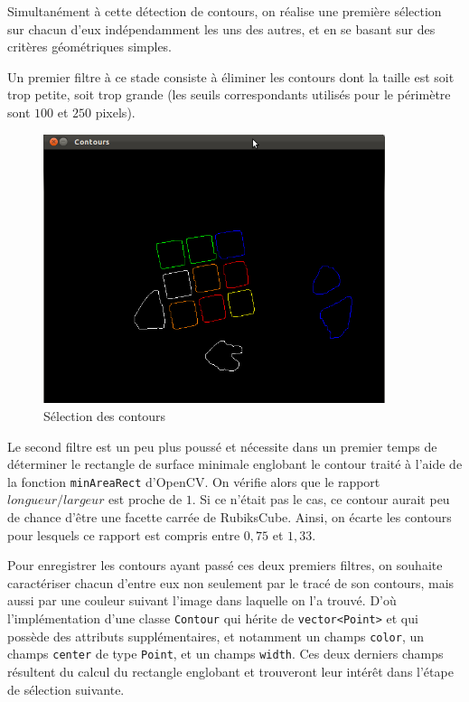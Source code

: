 \documentclass[a4paper,11pt]{article}
\begin{document}
Simultanément à cette détection de contours, on réalise une première sélection sur chacun d'eux indépendamment
les uns des autres, et en se basant sur des critères géométriques simples.

Un premier filtre à ce stade consiste à éliminer les contours dont la taille est soit trop petite, soit trop
grande (les seuils correspondants utilisés pour le périmètre sont $100$ et $250$ pixels).

\begin{figure}[ht]
\begin{center}
 \includegraphics[width=10cm]{contours.png} 
\end{center}
 \caption{Sélection des contours}
 \label{Sélection des contours}
\end{figure}

Le second filtre est un peu plus poussé et nécessite dans un premier temps de déterminer le rectangle de surface
minimale englobant le contour traité à l'aide de la fonction \verb|minAreaRect| d'OpenCV. 
On vérifie alors que le rapport $longueur / largeur$ est proche de $1$.
Si ce n'était pas le cas, ce contour aurait peu de chance d'être une facette carrée de RubiksCube. Ainsi, on
écarte les contours pour lesquels ce rapport est compris entre $0,75$ et $1,33$.

Pour enregistrer les contours ayant passé ces deux premiers filtres, on souhaite caractériser chacun d'entre eux
non seulement par le tracé de son contours, mais aussi par une couleur suivant l'image dans laquelle on l'a 
trouvé. D'où l'implémentation d'une classe \verb|Contour| qui hérite de \verb|vector<Point>| et qui possède
des attributs supplémentaires, et notamment un champs \verb|color|, un champs \verb|center| de type \verb|Point|,
et un champs \verb|width|. Ces deux derniers champs résultent du calcul du rectangle englobant et trouveront
leur intérêt dans l'étape de sélection suivante.
\end{document}
